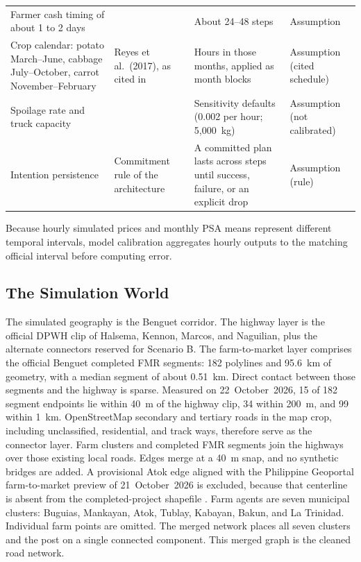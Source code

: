 \documentclass{icsthesis}
\begin{document}
\begin{mainmatter}
\begin{longtable}[l]{@{}>{\raggedright\arraybackslash}p{}>{\raggedright\arraybackslash}p{}>{\raggedright\arraybackslash}p{}>{\raggedright\arraybackslash}p{}@{}}
			Farmer cash timing of about 1 to 2 days & \citet{deGuzmanBambicoBaconguis2023} & About 24--48 steps & Assumption \\
			Crop calendar: potato March--June, cabbage July--October, carrot November--February & Reyes et al.\ (2017), as cited in \citet{deGuzmanBambicoBaconguis2023} & Hours in those months, applied as month blocks & Assumption (cited schedule) \\
			Spoilage rate and truck capacity & \citet{Antolin2024,Fernandez2004} & Sensitivity defaults (0.002 per hour; 5,000~kg) & Assumption (not calibrated) \\
			Intention persistence & Commitment rule of the architecture & A committed plan lasts across steps until success, failure, or an explicit drop & Assumption (rule) \\
			\end{longtable}
			\endgroup

			Because hourly simulated prices and monthly PSA means represent different temporal intervals, model calibration aggregates hourly outputs to the matching official interval before computing error.

		\subsection{The Simulation World}

			The simulated geography is the Benguet corridor. The highway layer is the official DPWH clip of Halsema, Kennon, Marcos, and Naguilian, plus the alternate connectors reserved for Scenario B. The farm-to-market layer comprises the official Benguet completed FMR segments: 182 polylines and 95.6~km of geometry, with a median segment of about 0.51~km. Direct contact between those segments and the highway is sparse. Measured on 22~October~2026, 15 of 182 segment endpoints lie within 40~m of the highway clip, 34 within 200~m, and 99 within 1~km. OpenStreetMap secondary and tertiary roads in the map crop, including unclassified, residential, and track ways, therefore serve as the connector layer. Farm clusters and completed FMR segments join the highways over those existing local roads. Edges merge at a 40~m snap, and no synthetic bridges are added. A provisional Atok edge aligned with the Philippine Geoportal farm-to-market preview of 21~October~2026 is excluded, because that centerline is absent from the completed-project shapefile \citep{GeoportalDAFMR2026}. Farm agents are seven municipal clusters: Buguias, Mankayan, Atok, Tublay, Kabayan, Bakun, and La Trinidad. Individual farm points are omitted. The merged network places all seven clusters and the post on a single connected component. This merged graph is the cleaned road network.


\end{mainmatter}
\end{document}
